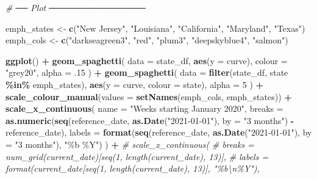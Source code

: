 \documentclass[
]{article}
\newenvironment{Shaded}{\begin{snugshade}}{\end{snugshade}}
\newcommand{\AttributeTok}[1]{\textcolor[rgb]{0.13,0.29,0.53}{#1}}
\newcommand{\CommentTok}[1]{\textcolor[rgb]{0.56,0.35,0.01}{\textit{#1}}}
\newcommand{\DecValTok}[1]{\textcolor[rgb]{0.00,0.00,0.81}{#1}}
\newcommand{\FunctionTok}[1]{\textcolor[rgb]{0.13,0.29,0.53}{\textbf{#1}}}
\newcommand{\NormalTok}[1]{#1}
\newcommand{\OtherTok}[1]{\textcolor[rgb]{0.56,0.35,0.01}{#1}}
\newcommand{\SpecialCharTok}[1]{\textcolor[rgb]{0.81,0.36,0.00}{\textbf{#1}}}
\newcommand{\StringTok}[1]{\textcolor[rgb]{0.31,0.60,0.02}{#1}}
\begin{document}
\begin{Shaded}
\begin{Highlighting}[]
\CommentTok{\# ── Plot ────────────────}


\NormalTok{emph\_states }\OtherTok{\textless{}{-}} \FunctionTok{c}\NormalTok{(}\StringTok{"New Jersey"}\NormalTok{, }\StringTok{"Louisiana"}\NormalTok{, }\StringTok{"California"}\NormalTok{, }\StringTok{"Maryland"}\NormalTok{, }\StringTok{"Texas"}\NormalTok{)}
\NormalTok{emph\_cols   }\OtherTok{\textless{}{-}} \FunctionTok{c}\NormalTok{(}\StringTok{"darkseagreen3"}\NormalTok{, }\StringTok{"red"}\NormalTok{, }\StringTok{"plum3"}\NormalTok{, }\StringTok{"deepskyblue4"}\NormalTok{, }\StringTok{"salmon"}\NormalTok{)}

\FunctionTok{ggplot}\NormalTok{() }\SpecialCharTok{+}
  \FunctionTok{geom\_spaghetti}\NormalTok{(}
    \AttributeTok{data   =}\NormalTok{ state\_df,}
    \FunctionTok{aes}\NormalTok{(}\AttributeTok{y =}\NormalTok{ curve),}
    \AttributeTok{colour =} \StringTok{"grey20"}\NormalTok{, }\AttributeTok{alpha =}\NormalTok{ .}\DecValTok{15}
\NormalTok{  ) }\SpecialCharTok{+}
  \FunctionTok{geom\_spaghetti}\NormalTok{(}
    \AttributeTok{data   =} \FunctionTok{filter}\NormalTok{(state\_df, state }\SpecialCharTok{\%in\%}\NormalTok{ emph\_states),}
    \FunctionTok{aes}\NormalTok{(}\AttributeTok{y =}\NormalTok{ curve, }\AttributeTok{colour =}\NormalTok{ state), }\AttributeTok{alpha =} \DecValTok{5}
\NormalTok{  ) }\SpecialCharTok{+}
  \FunctionTok{scale\_colour\_manual}\NormalTok{(}\AttributeTok{values =} \FunctionTok{setNames}\NormalTok{(emph\_cols, emph\_states)) }\SpecialCharTok{+}
  \FunctionTok{scale\_x\_continuous}\NormalTok{(}
    \AttributeTok{name =} \StringTok{"Weeks starting January 2020"}\NormalTok{,}
    \AttributeTok{breaks =} \FunctionTok{as.numeric}\NormalTok{(}\FunctionTok{seq}\NormalTok{(reference\_date, }\FunctionTok{as.Date}\NormalTok{(}\StringTok{"2021{-}01{-}01"}\NormalTok{), }\AttributeTok{by =} \StringTok{"3 months"}\NormalTok{) }\SpecialCharTok{{-}}\NormalTok{ reference\_date),}
    \AttributeTok{labels =} \FunctionTok{format}\NormalTok{(}\FunctionTok{seq}\NormalTok{(reference\_date, }\FunctionTok{as.Date}\NormalTok{(}\StringTok{"2021{-}01{-}01"}\NormalTok{), }\AttributeTok{by =} \StringTok{"3 months"}\NormalTok{), }\StringTok{"\%b \%Y"}\NormalTok{)}
\NormalTok{  ) }\SpecialCharTok{+}
  \CommentTok{\# scale\_x\_continuous(}
  \CommentTok{\#   breaks = num\_grid(current\_date)[seq(1, length(current\_date), 13)],}
  \CommentTok{\#   labels = format(current\_date[seq(1, length(current\_date), 13)], "\%b\textbackslash{}n\%Y"),}

\end{Highlighting}
\end{Shaded}
\end{document}
